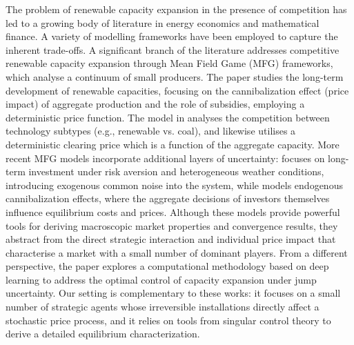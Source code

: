 \documentclass[10pt]{article}
\numberwithin{equation}{section}
\theoremstyle{plain}
\numberwithin{theorem}{section}
\theoremstyle{definition}
\newcommand{\<}{\langle}
\renewcommand{\>}{\rangle}
\renewcommand{\(}{\left(}
\renewcommand{\)}{\right)}
\begin{document}
{The problem of renewable capacity expansion in the presence of competition has led to a growing body of literature in energy economics and mathematical finance. A variety of modelling frameworks have been employed to capture the inherent trade-offs. A significant branch of the literature addresses competitive renewable capacity expansion through Mean Field Game (MFG) frameworks, which analyse a continuum of small producers.
The paper \cite{MR4672784} studies the long-term development of renewable capacities, focusing on the cannibalization effect (price impact) of aggregate production and the role of subsidies, employing a deterministic price function.
The model in \cite{MR3715150} analyses the competition between technology subtypes (e.g., renewable vs. coal), and likewise utilises a deterministic clearing price which is a function of the aggregate capacity. More recent MFG models incorporate additional layers of uncertainty: \cite{escribe24} focuses on long-term investment under risk aversion and heterogeneous weather conditions, introducing exogenous common noise into the system, while \cite{hubert2025} models endogenous cannibalization effects, where the aggregate decisions of investors themselves influence equilibrium costs and prices. Although these models provide powerful tools for deriving macroscopic market properties and convergence results, they abstract from the direct strategic interaction and individual price impact that characterise a market with a small number of dominant players. %
From a different perspective, the paper \cite{agram2025} explores a computational methodology based on deep learning to address the optimal control of capacity expansion under jump uncertainty. 
Our setting is complementary to these works: it focuses on a small number of strategic agents whose irreversible installations directly affect a stochastic price process, and it relies on tools from singular control theory to derive a detailed equilibrium characterization.



}
\end{document}
